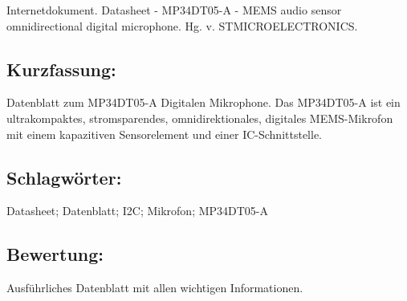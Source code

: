 \hfill
\begin{minipage}{0.48\textwidth}
Internetdokument. Datasheet - MP34DT05-A - MEMS audio sensor omnidirectional digital microphone. Hg. v. STMICROELECTRONICS.
\subsection*{Kurzfassung:}
Datenblatt zum MP34DT05-A Digitalen Mikrophone. Das MP34DT05-A ist ein ultrakompaktes, stromsparendes, omnidirektionales, digitales MEMS-Mikrofon mit einem kapazitiven Sensorelement und einer IC-Schnittstelle.
\subsection*{Schlagwörter:}
Datasheet; Datenblatt; I2C; Mikrofon; MP34DT05-A
\end{minipage}
\subsection*{Bewertung:}
Ausführliches Datenblatt mit allen wichtigen Informationen.

